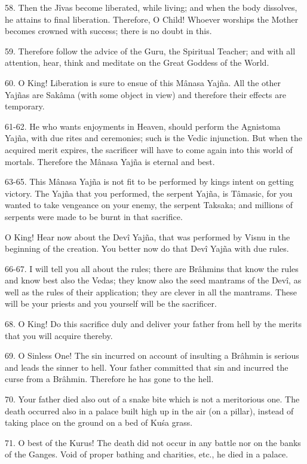 58. Then the J\^ivas become liberated, while living; and when the body dissolves, he attains to final liberation. Therefore, O Child! Whoever worships the Mother becomes crowned with success; there is no doubt in this.

59. Therefore follow the advice of the Guru, the Spiritual Teacher; and with all attention, hear, think and meditate on the Great Goddess of the World.

60. O King! Liberation is sure to ensue of this M\^anasa Yaj\~na. All the other Yaj\~nas are Sak\^ama (with some object in view) and therefore their effects are temporary.

61-62. He who wants enjoyments in Heaven, should perform the Agnistoma Yaj\~na, with due rites and ceremonies; such is the Vedic injunction. But when the acquired merit expires, the sacrificer will have to come again into this world of mortals. Therefore the M\^anasa Yaj\~na is eternal and best.

63-65. This M\^anasa Yaj\~na is not fit to be performed by kings intent on getting victory. The Yaj\~na that you performed, the serpent Yaj\~na, is T\^amasic, for you wanted to take vengeance on your enemy, the serpent Taksaka; and millions of serpents were made to be burnt in that sacrifice.

O King! Hear now about the Dev\^i Yaj\~na, that was performed by Visnu in the beginning of the creation. You better now do that Dev\^i Yaj\~na with due rules.

66-67. I will tell you all about the rules; there are Br\^ahmins that know the rules and know best also the Vedas; they know also the seed mantrams of the Dev\^i, as well as the rules of their application; they are clever in all the mantrams. These will be your priests and you yourself will be the sacrificer.

68. O King! Do this sacrifice duly and deliver your father from hell by the merits that you will acquire thereby.

69. O Sinless One! The sin incurred on account of insulting a Br\^ahmin is serious and leads the sinner to hell. Your father committed that sin and incurred the curse from a Br\^ahmin. Therefore he has gone to the hell.

70. Your father died also out of a snake bite which is not a meritorious one. The death occurred also in a palace built high up in the air (on a pillar), instead of taking place on the ground on a bed of Ku\'sa grass.

71. O best of the Kurus! The death did not occur in any battle nor on the banks of the Ganges. Void of proper bathing and charities, etc., he died in a palace.

